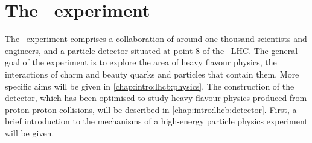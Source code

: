 \chapter{The \lhcb\ experiment}
\label{chap:intro:lhcb}

The \lhcb\ experiment comprises a collaboration of around one thousand 
scientists and engineers, and a particle detector situated at point 8 of the 
\cern\ \ac{LHC}.
The general goal of the experiment is to explore the area of heavy flavour 
physics, the interactions of charm and beauty quarks and particles that contain 
them.
More specific aims will be given in \cref{chap:intro:lhcb:physics}.
The construction of the detector, which has been optimised to study heavy 
flavour physics produced from proton-proton collisions, will be described in 
\cref{chap:intro:lhcb:detector}.
First, a brief introduction to the mechanisms of a high-energy particle physics 
experiment will be given.



